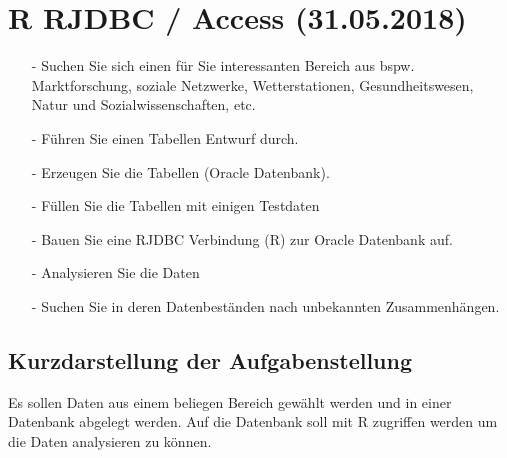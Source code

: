 \section{R RJDBC / Access (31.05.2018) }
\begin{itemize}
\item[-]Suchen Sie sich einen für Sie interessanten Bereich aus bspw. Marktforschung, soziale Netzwerke, Wetterstationen, Gesundheitswesen, Natur und Sozialwissenschaften, etc.
\item[-]Führen Sie einen Tabellen Entwurf durch.
\item[-]Erzeugen Sie die Tabellen (Oracle Datenbank).
\item[-]Füllen Sie die Tabellen mit einigen Testdaten
\item[-]Bauen Sie eine RJDBC Verbindung (R) zur Oracle Datenbank auf.
\item[-]Analysieren Sie die Daten
\item[-]Suchen Sie in deren Datenbeständen nach unbekannten Zusammenhängen.
\end{itemize}
\subsection*{Kurzdarstellung der Aufgabenstellung}
Es sollen Daten aus einem beliegen Bereich gewählt werden und in einer Datenbank abgelegt werden. Auf die Datenbank soll mit R zugriffen werden um die Daten analysieren zu können.
